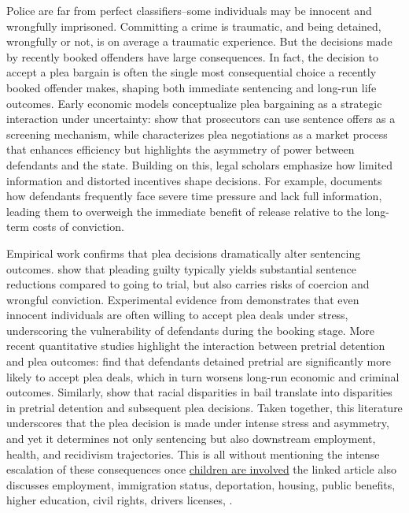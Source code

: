\documentclass[12pt, a4paper]{article}
\begin{document}
Police are far from perfect classifiers--some individuals may be innocent and wrongfully imprisoned. Committing a crime is traumatic, and being detained, wrongfully or not, is on average a traumatic experience. But the decisions made by recently booked offenders have large consequences. In fact, the decision to accept a plea bargain is often the single most consequential choice a recently booked offender makes, shaping both immediate sentencing and long-run life outcomes. Early economic models conceptualize plea bargaining as a strategic interaction under uncertainty: \citet{GrossmanKatz1983} show that prosecutors can use sentence offers as a screening mechanism, while \citet{Easterbrook1983} characterizes plea negotiations as a market process that enhances efficiency but highlights the asymmetry of power between defendants and the state. Building on this, legal scholars emphasize how limited information and distorted incentives shape decisions. For example, \citet{Bibas2004} documents how defendants frequently face severe time pressure and lack full information, leading them to overweigh the immediate benefit of release relative to the long-term costs of conviction.

Empirical work confirms that plea decisions dramatically alter sentencing outcomes. \citet{BushwayRedlich2012} show that pleading guilty typically yields substantial sentence reductions compared to going to trial, but also carries risks of coercion and wrongful conviction. Experimental evidence from \citet{DervanEdkins2013} demonstrates that even innocent individuals are often willing to accept plea deals under stress, underscoring the vulnerability of defendants during the booking stage. More recent quantitative studies highlight the interaction between pretrial detention and plea outcomes: \citet{Dobbie2018} find that defendants detained pretrial are significantly more likely to accept plea deals, which in turn worsens long-run economic and criminal outcomes. Similarly, \citet{LesliePope2017} show that racial disparities in bail translate into disparities in pretrial detention and subsequent plea decisions. Taken together, this literature underscores that the plea decision is made under intense stress and asymmetry, and yet it determines not only sentencing but also downstream employment, health, and recidivism trajectories. This is all without mentioning the intense escalation of these consequences once \href{https://www.vera.org/news/how-collateral-consequences-keep-people-trapped-in-the-legal-system}{children are involved} the linked article also discusses employment, immigration status, deportation, housing, public benefits, higher education, civil rights, drivers licenses, .
\end{document}
